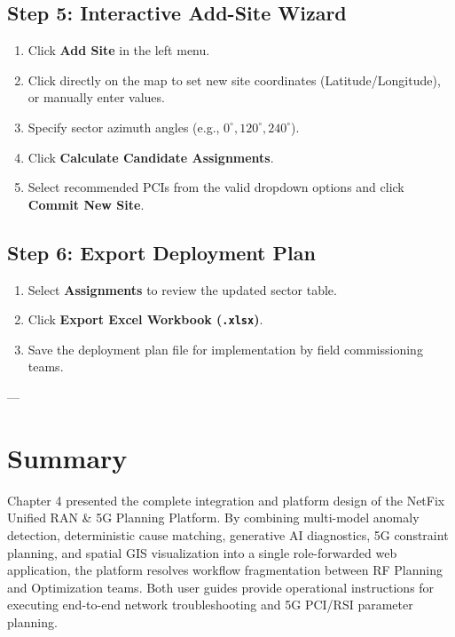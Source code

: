 \documentclass[12pt,a4paper]{report}
\begin{document}
\subsection{Step 5: Interactive Add-Site Wizard}
\begin{enumerate}
    \item Click \textbf{Add Site} in the left menu.
    \item Click directly on the map to set new site coordinates (Latitude/Longitude), or manually enter values.
    \item Specify sector azimuth angles (e.g., $0^\circ, 120^\circ, 240^\circ$).
    \item Click \textbf{Calculate Candidate Assignments}.
    \item Select recommended PCIs from the valid dropdown options and click \textbf{Commit New Site}.
\end{enumerate}

\subsection{Step 6: Export Deployment Plan}
\begin{enumerate}
    \item Select \textbf{Assignments} to review the updated sector table.
    \item Click \textbf{Export Excel Workbook (\texttt{.xlsx})}.
    \item Save the deployment plan file for implementation by field commissioning teams.
\end{enumerate}

---

\section{Summary}
Chapter 4 presented the complete integration and platform design of the NetFix Unified RAN & 5G Planning Platform. By combining multi-model anomaly detection, deterministic cause matching, generative AI diagnostics, 5G constraint planning, and spatial GIS visualization into a single role-forwarded web application, the platform resolves workflow fragmentation between RF Planning and Optimization teams. Both user guides provide operational instructions for executing end-to-end network troubleshooting and 5G PCI/RSI parameter planning.
\end{document}
